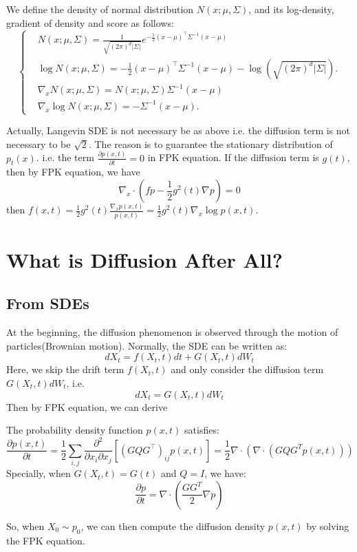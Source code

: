 \begin{remark}
    We define the density of normal distribution $N(x ; \mu, \Sigma)$, and its log-density, gradient of density and score as follows:
    \begin{equation}\left\{
        \begin{aligned}
            &N(x ; \mu, \Sigma)=\frac{1}{\sqrt{(2 \pi)^{d}|\Sigma|}} e^{-\frac{1}{2}(x-\mu)^{\top} \Sigma^{-1}(x-\mu)}\\
            &\log N(x ; \mu, \Sigma)=-\frac{1}{2}(x-\mu)^{\top} \Sigma^{-1}(x-\mu)-\log \left(\sqrt{(2 \pi)^{d}|\Sigma|}\right) . \\
            &\nabla_{x} N(x ; \mu, \Sigma)=N(x ; \mu, \Sigma)\Sigma^{-1}(x-\mu) \\
            &\nabla_{x} \log N(x ; \mu, \Sigma)=-\Sigma^{-1}(x-\mu) .
        \end{aligned}\right.
    \end{equation}
\end{remark}

Actually, Langevin SDE is not necessary be as above i.e. the diffusion term is not necessary to be $\sqrt{2}$. The reason is to guarantee the stationary distribution of $p_t(x)$.
i.e. the term $\frac{\partial p(x,t)}{\partial t}=0$ in FPK equation. If the diffusion term is $g(t)$, then by FPK equation, we have 
$$\nabla_x\cdot(fp-\frac{1}{2}g^2(t)\nabla p)=0$$
then $f(x,t) = \frac{1}{2}g^2(t)\frac{\nabla_x p(x, t)}{p(x,t)}=\frac{1}{2}g^2(t)\nabla_x\log p(x, t)$.

\section{What is Diffusion After All?}
\subsection{From SDEs}
At the beginning, the diffusion phenomenon is observed through the motion of particles(Brownian motion). 
Normally, the SDE can be written as:
\begin{equation}
    dX_t = f(X_t, t)dt + G(X_t, t)dW_t
\end{equation}
Here, we skip the drift term $f(X_t, t)$ and only consider the diffusion term $G(X_t, t)dW_t$, i.e.
\begin{equation}
    dX_t = G(X_t, t)dW_t
\end{equation}
Then by FPK equation, we can derive 
\begin{theorem}
    The probability density function $p(x, t)$ satisfies:
\begin{equation}
    \frac{\partial p(x, t)}{\partial t} = \frac{1}{2} \sum_{i, j} \frac{\partial^{2}}{\partial x_{i} \partial x_{j}}\left[\left(G Q G^{\top}\right)_{i j} p(x, t)\right]=\frac{1}{2}\nabla \cdot \left(\nabla\cdot (GQG^Tp(x, t))\right)
\end{equation}
Specially, when $G(X_t, t)=G(t)$ and $Q=I$, we have:
\begin{equation}
    \frac{\partial p}{\partial t} = \nabla \cdot \left(\frac{GG^T}{2}\nabla p\right)
\end{equation}
\end{theorem}
So, when $X_0\sim p_0$, we can then compute the diffusion density $p(x, t)$ by solving the FPK equation.
